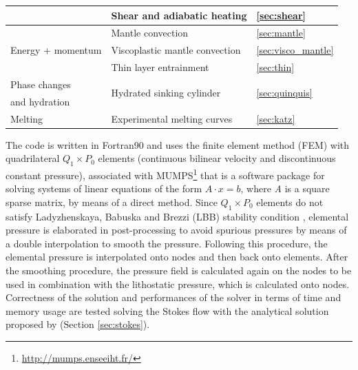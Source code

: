 \documentclass[hidelinks,10pt,a4paper]{article}
\begin{document}
\begin{table}[H]
\begin{tabular}{| l | l | l |}
    & Shear and adiabatic heating & \ref{sec:shear} \\
\hline
\multirow{3}{*}{Energy + momentum} & Mantle convection & \ref{sec:mantle} \\
& Viscoplastic mantle convection & \ref{sec:visco_mantle} \\
& Thin layer entrainment & \ref{sec:thin} \\
\hline
  Phase changes  & \multirow{2}{*}{Hydrated sinking cylinder} & \multirow{2}{*}{\ref{sec:quinquis}} \\
  and hydration  &  & \\
\hline
  Melting & Experimental melting curves & \ref{sec:katz} \\
\bottomrule
\end{tabular}
\label{tab:list}
\end{table}

The code is written in Fortran90 and uses the finite element method (FEM) with quadrilateral $Q_1 \times P_0$ elements (continuous bilinear velocity and
discontinuous constant pressure), associated with MUMPS\footnote{\url{http://mumps.enseeiht.fr/}} \citep{Amestoy2001,Amestoy2019} that is a software package
for solving systems of linear equations of the form $A \cdot x = b$, where \textit{A} is a square sparse matrix, by means of a direct method. Since
$Q_1 \times P_0$ elements do not satisfy Ladyzhenskaya, Babuska and Brezzi (LBB) stability condition \citep{Donea2003}, elemental pressure is elaborated
in post-processing to avoid spurious pressures by means of a double interpolation to smooth the pressure. Following this procedure, the elemental pressure
is interpolated onto nodes and then back onto elements. After the smoothing procedure, the pressure field is calculated again on the nodes to be used in
combination with the lithostatic pressure, which is calculated onto nodes. Correctness of the solution and performances of the solver in terms of time and
memory usage are tested solving the Stokes flow with the analytical solution proposed by \citet{Donea2003} (Section \ref{sec:stokes}).
\end{document}
